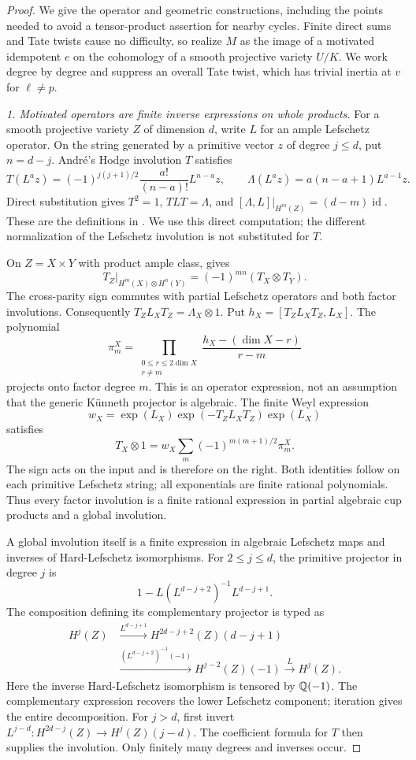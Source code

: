 \begin{proof}
We give the operator and geometric constructions, including the
points needed to avoid a tensor-product assertion for nearby cycles.
Finite direct sums and Tate twists cause no difficulty, so realize
$M$ as the image of a motivated idempotent $e$ on the cohomology
of a smooth projective variety $U/K$. We work degree by degree
and suppress an overall Tate twist, which has trivial inertia
at $v$ for $\ell\ne p$.

\emph{1. Motivated operators are finite inverse expressions on whole products.}
For a smooth projective variety $Z$ of dimension $d$, write $L$
for an ample Lefschetz operator. On the string generated by a
primitive vector $z$ of degree $j\leq d$, put $n=d-j$.
Andr\'e's Hodge involution $T$ satisfies
\[
 T(L^a z)=(-1)^{j(j+1)/2}\frac{a!}{(n-a)!}L^{n-a}z,
 \qquad
 \Lambda(L^a z)=a(n-a+1)L^{a-1}z.
\]
Direct substitution gives $T^2=1$, $TLT=\Lambda$, and
$[\Lambda,L]|_{H^m(Z)}=(d-m)\operatorname{id}$.
These are the definitions in
\citet[\S1.1, printed p.~10]{c_andre1996}.
We use this direct computation; the different normalization of
the Lefschetz involution is not substituted for $T$.

On $Z=X\times Y$ with product ample class,
\citet[Lemma~1.3.2, printed p.~13]{c_andre1996} gives
\[
 T_Z|_{H^m(X)\otimes H^n(Y)}
       =(-1)^{mn}(T_X\otimes T_Y).
\]
The cross-parity sign commutes with partial Lefschetz operators
and both factor involutions. Consequently
$T_ZL_XT_Z=\Lambda_X\otimes1$.
Put $h_X=[T_ZL_XT_Z,L_X]$. The polynomial
\[
 \pi_m^X=
 \prod_{\substack{0\leq r\leq2\dim X\\r\ne m}}
       \frac{h_X-(\dim X-r)}{r-m}
\]
projects onto factor degree $m$. This is an operator expression,
not an assumption that the generic K\"unneth projector is algebraic.
The finite Weyl expression
\[
 w_X=\exp(L_X)\exp(-T_ZL_XT_Z)\exp(L_X)
\]
satisfies
\[
 T_X\otimes1
     =w_X\sum_m(-1)^{m(m+1)/2}\pi_m^X.
\]
The sign acts on the input and is therefore on the right.
Both identities follow on each primitive Lefschetz string;
all exponentials are finite rational polynomials.
Thus every factor involution is a finite rational expression
in partial algebraic cup products and a global involution.

A global involution itself is a finite expression in algebraic
Lefschetz maps and inverses of Hard-Lefschetz isomorphisms.
For $2\leq j\leq d$, the primitive projector in degree $j$ is
\[
 1-L(L^{d-j+2})^{-1}L^{d-j+1}.
\]
The composition defining its complementary projector is typed as
\[
\begin{aligned}
 H^j(Z)&\xrightarrow{L^{d-j+1}}
 H^{2d-j+2}(Z)(d-j+1)\\
 &\xrightarrow{(L^{d-j+2})^{-1}(-1)}
 H^{j-2}(Z)(-1)\xrightarrow{L}H^j(Z).
\end{aligned}
\]
Here the inverse Hard-Lefschetz isomorphism is tensored by $\mathbb Q(-1)$.
The complementary expression recovers the lower Lefschetz component;
iteration gives the entire decomposition.
For $j>d$, first invert
$L^{j-d}:H^{2d-j}(Z)\to H^j(Z)(j-d)$.
The coefficient formula for $T$ then supplies the involution.
Only finitely many degrees and inverses occur.


\end{proof}
